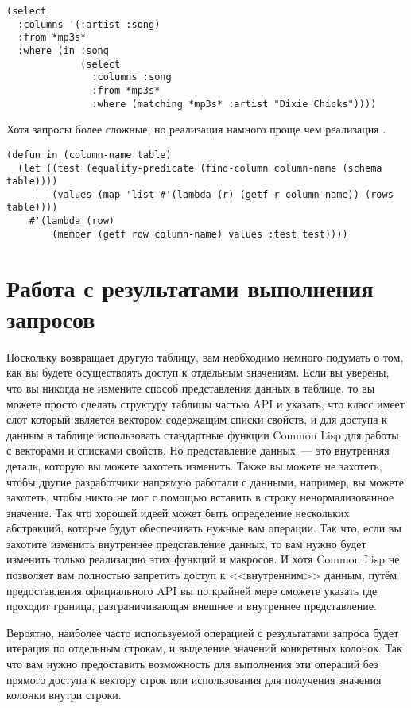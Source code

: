 \begin{lstlisting}
(select
  :columns '(:artist :song)
  :from *mp3s*
  :where (in :song 
             (select
               :columns :song
               :from *mp3s*
               :where (matching *mp3s* :artist "Dixie Chicks"))))
\end{lstlisting}

Хотя запросы более сложные, но реализация  намного проще чем реализация
.

\begin{lstlisting}
(defun in (column-name table)
  (let ((test (equality-predicate (find-column column-name (schema table))))
        (values (map 'list #'(lambda (r) (getf r column-name)) (rows table))))
    #'(lambda (row)
        (member (getf row column-name) values :test test))))
\end{lstlisting}

\section{Работа с результатами выполнения запросов}

Поскольку  возвращает другую таблицу, вам необходимо немного подумать о том,
как вы будете осуществлять доступ к отдельным значениям.  Если вы уверены, что вы никогда
не измените способ представления данных в таблице, то вы можете просто сделать структуру
таблицы частью API и указать, что класс  имеет слот  который
является вектором содержащим списки свойств, и для доступа к данным в таблице использовать
стандартные функции Common Lisp для работы с векторами и списками свойств.  Но
представление данных~--- это внутренняя деталь, которую вы можете захотеть изменить.
Также вы можете не захотеть, чтобы другие разработчики напрямую работали с данными,
например, вы можете захотеть, чтобы никто не мог с помощью  вставить в строку
ненормализованное значение.  Так что хорошей идеей может быть определение нескольких
абстракций, которые будут обеспечивать нужные вам операции.  Так что, если вы захотите
изменить внутреннее представление данных, то вам нужно будет изменить только реализацию
этих функций и макросов.  И хотя Common Lisp не позволяет вам полностью запретить доступ к
<<внутренним>> данным, путём предоставления официального API вы по крайней мере сможете
указать где проходит граница, разграничивающая внешнее и внутреннее представление.

Вероятно, наиболее часто используемой операцией с результатами запроса будет итерация по
отдельным строкам, и выделение значений конкретных колонок.  Так что вам нужно
предоставить возможность для выполнения эти операций без прямого доступа к вектору строк
или использования  для получения значения колонки внутри строки.

